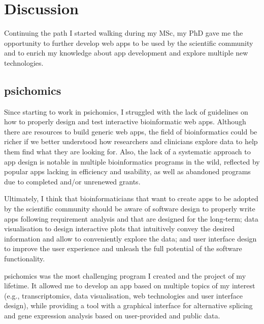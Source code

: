 \chapter{Discussion}

Continuing the path I started walking during my MSc, my PhD gave me the opportunity to further develop web apps to be used by the scientific community and to enrich my knowledge about app development and explore multiple new technologies.

\section{psichomics}

Since starting to work in psichomics, I struggled with the lack of guidelines on how to properly design and test interactive bioinformatic web apps. Although there are resources to build generic web apps, the field of bioinformatics could be richer if we better understood how researchers and clinicians explore data to help them find what they are looking for. Also, the lack of a systematic approach to app design is notable in multiple bioinformatics programs in the wild, reflected by popular apps lacking in efficiency and usability, as well as abandoned programs due to completed and/or unrenewed grants.

Ultimately, I think that bioinformaticians that want to create apps to be adopted by the scientific community should be aware of software design to properly write apps following requirement analysis and that are designed for the long-term; data visualisation to design interactive plots that intuitively convey the desired information and allow to conveniently explore the data; and user interface design to improve the user experience and unleash the full potential of the software functionality.

psichomics was the most challenging program I created and the project of my lifetime. It allowed me to develop an app based on multiple topics of my interest (e.g., transcriptomics, data visualisation, web technologies and user interface design), while providing a tool with a graphical interface for alternative splicing and gene expression analysis based on user-provided and public data. %

